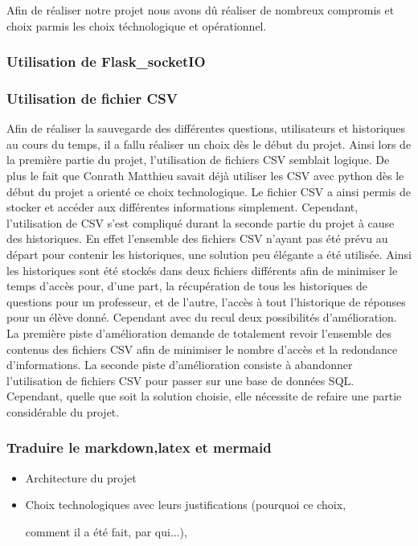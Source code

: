 \documentclass[a4paper, 12pt]{article}
\begin{document}
Afin de réaliser notre projet nous avons dû réaliser de nombreux compromis et choix parmis les choix téchnologique et opérationnel.

 \subsubsection{Utilisation de Flask\_socketIO}
 
 \subsubsection{Utilisation de fichier CSV}
 
 
 Afin de réaliser la sauvegarde des différentes questions, utilisateurs et historiques au cours du temps, il a fallu réaliser un choix dès le début du projet. 
 Ainsi lors de la première partie du projet, l'utilisation de fichiers CSV semblait logique.
 De plus le fait que Conrath Matthieu savait déjà utiliser les CSV avec python dès le début du projet a orienté ce choix technologique. 
 Le fichier CSV a ainsi permis de stocker et accéder aux différentes informations simplement.
 Cependant, l'utilisation de CSV s'est compliqué durant la seconde partie du projet à cause des historiques.
 En effet l'ensemble des fichiers CSV n'ayant pas été prévu au départ pour contenir les historiques, une solution peu élégante a été utilisée. 
 Ainsi les historiques sont été stockés dans deux fichiers différents afin de minimiser le temps d'accès pour, d'une part, la récupération de tous les historiques de questions pour un professeur, et de l'autre, l'accès à tout l'historique de réponses pour un élève donné. 
 Cependant avec du recul deux possibilités d'amélioration.
 La première piste d'amélioration demande de totalement revoir l'ensemble des contenus des fichiers CSV afin de minimiser le nombre d'accès et la redondance d'informations. 
 La seconde piste d'amélioration consiste à abandonner l'utilisation de fichiers CSV pour passer sur une base de données SQL. Cependant, quelle que soit la solution choisie, elle nécessite de refaire une partie considérable du projet.
 
 \subsubsection{Traduire le markdown,latex et mermaid}
\begin{itemize}
\item Architecture du projet
\item Choix technologiques  avec leurs justifications (pourquoi ce choix, 

comment il a été fait, par qui...),
\end{itemize}
\end{document}
